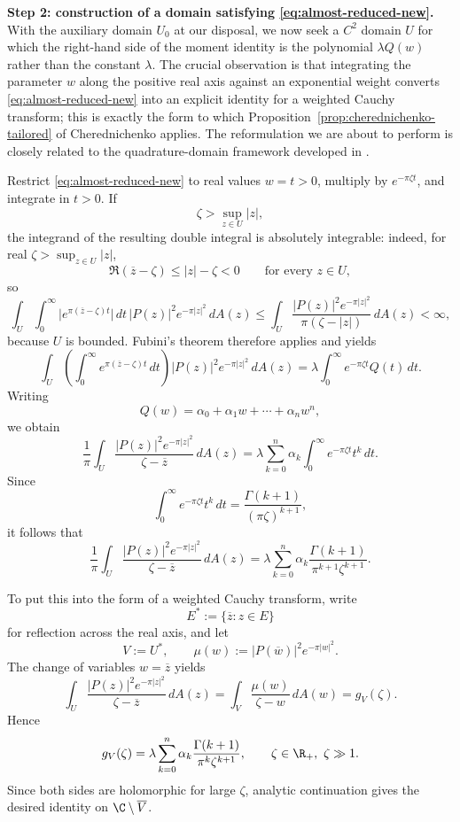\medskip
\noindent\textbf{Step 2: construction of a domain satisfying \eqref{eq:almost-reduced-new}.}
With the auxiliary domain $U_0$ at our disposal, we now seek a $C^2$ domain $U$ for which the right-hand side of the moment identity is the polynomial $\lambda Q(w)$ rather than the constant $\lambda$. The crucial observation is that integrating the parameter $w$ along the positive real axis against an exponential weight converts \eqref{eq:almost-reduced-new} into an explicit identity for a weighted Cauchy transform; this is exactly the form to which Proposition~\ref{prop:cherednichenko-tailored} of Cherednichenko \cite{Cherednichenko} applies. The reformulation we are about to perform is closely related to the quadrature-domain framework developed in \cite{Gustafsson,Gustafsson-Shahgholian,Karp,Shahgholian}.

Restrict \eqref{eq:almost-reduced-new} to real values $w=t>0$, multiply by $e^{-\pi \zeta t}$, and integrate in $t>0$. If
\[
\zeta>\sup_{z\in U}|z|,
\]
the integrand of the resulting double integral is absolutely integrable: indeed, for real $\zeta>\sup_{z\in U}|z|$,
\[
\Re(\overline z-\zeta)\le |z|-\zeta<0
\qquad \text{for every } z\in U,
\]
so
\[
\int_U \int_0^\infty \big|e^{\pi(\overline z-\zeta)t}\big|\,dt\,|P(z)|^2 e^{-\pi|z|^2}\,dA(z)
\le
\int_U \frac{|P(z)|^2 e^{-\pi|z|^2}}{\pi(\zeta-|z|)}\,dA(z)<\infty,
\]
because $U$ is bounded. Fubini's theorem therefore applies and yields
\[
\int_U \left(\int_0^\infty e^{\pi(\overline z-\zeta)t}\,dt\right)|P(z)|^2e^{-\pi|z|^2}\,dA(z)
=
\lambda\int_0^\infty e^{-\pi\zeta t}Q(t)\,dt.
\]
Writing
\[
Q(w)=\alpha_0+\alpha_1 w+\cdots+\alpha_n w^n,
\]
we obtain
\[
\frac{1}{\pi}\int_U \frac{|P(z)|^2e^{-\pi|z|^2}}{\zeta-\overline z}\,dA(z)
=
\lambda \sum_{k=0}^n \alpha_k \int_0^\infty e^{-\pi \zeta t} t^k\,dt.
\]
Since
\[
\int_0^\infty e^{-\pi \zeta t} t^k\,dt
=
\frac{\Gamma(k+1)}{(\pi \zeta)^{k+1}},
\]
it follows that
\[
\frac{1}{\pi}\int_U \frac{|P(z)|^2e^{-\pi|z|^2}}{\zeta-\overline z}\,dA(z)
=
\lambda \sum_{k=0}^n \alpha_k \frac{\Gamma(k+1)}{\pi^{k+1}\zeta^{k+1}}.
\]

To put this into the form of a weighted Cauchy transform, write
\[
E^\ast:=\{\overline z:z\in E\}
\]
for reflection across the real axis, and let
\[
V:=U^\ast,
\qquad
\mu(w):=|P(\overline w)|^2 e^{-\pi|w|^2}.
\]
The change of variables $w=\overline z$ yields
\[
\int_U \frac{|P(z)|^2e^{-\pi|z|^2}}{\zeta-\overline z}\,dA(z)
=
\int_V \frac{\mu(w)}{\zeta-w}\,dA(w)
=
g_V(\zeta).
\]
Hence
\begin{equation}\label{eq:analytic-construct-new}
g_V(\zeta)
=
\lambda \sum_{k=0}^n \alpha_k \frac{\Gamma(k+1)}{\pi^k \zeta^{k+1}},
\qquad \zeta\in \R_+, \ \zeta\gg 1.
\end{equation}
Since both sides are holomorphic for large $\zeta$, analytic continuation gives the desired identity on $\C\setminus\overline V$.

